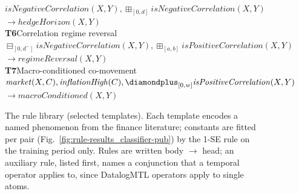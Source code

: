 \begin{figure}[t]
{\begin{minipage}{0.95\textwidth}
\hspace*{1.5em}\mbox{$\mathit{isNegativeCorrelation}(X,Y), \boxplus_{[0,d]} \mathit{isNegativeCorrelation}(X,Y)$}\\
\hspace*{1.5em}\hspace*{3em}\mbox{$\to \mathit{hedgeHorizon}(X,Y)$}\\[5pt]
\textbf{T6}\quad Correlation regime reversal~\cite{ang2002regimeshifts}\\
\hspace*{1.5em}\mbox{$\boxminus_{[0, d^{-}]}\mathit{isNegativeCorrelation}(X,Y), \boxplus_{[a,b]}\mathit{isPositiveCorrelation}(X,Y)$}\\
\hspace*{1.5em}\hspace*{3em}\mbox{$\to \mathit{regimeReversal}(X,Y)$}\\[5pt]
\textbf{T7}\quad Macro-conditioned co-movement~\cite{bekaert2013risk}\hspace{1em plus 1fill}{\footnotesize (fitted constants: $w$)}\\
\hspace*{1.5em}\mbox{$\mathit{market}(X,C), \mathit{inflationHigh}(C), \diamondplus_{[0,w]} \mathit{isPositiveCorrelation}(X,Y)$}\\
\hspace*{1.5em}\hspace*{3em}\mbox{$\to \mathit{macroConditioned}(X,Y)$}
\end{minipage}}
\caption{The rule library (selected templates). Each template encodes a named phenomenon from the finance literature; constants are fitted per pair (Fig.~\ref{fig:rule-results_classifier-pub}) by the 1-SE rule on the training period only. Rules are written body $\to$ head; an auxiliary rule, listed first, names a conjunction that a temporal operator applies to, since DatalogMTL operators apply to single atoms.}
\label{fig:rule-library-pub}
\end{figure}
